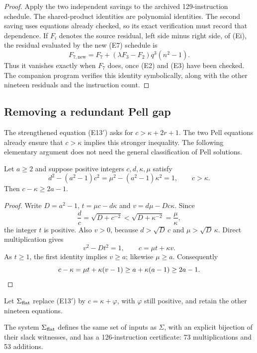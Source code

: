 \begin{proof}
Apply the two independent savings to the archived 129-instruction
schedule. The shared-product identities are polynomial identities. The
second saving uses equations already checked, so its exact verification
must record that dependence. If $F_i$ denotes the source residual, left
side minus right side, of (Ei), the residual evaluated by the new (E7)
schedule is
\[
 F_{7,\mathrm{new}}
   =F_7+(\lambda F_3-F_2)q^3(n^2-1).
\]
Thus it vanishes exactly when $F_7$ does, once (E2) and (E3) have been
checked. The companion program verifies this identity symbolically,
along with the other nineteen residuals and the instruction count.
\end{proof}

\subsection{Removing a redundant Pell gap}

The strengthened equation (E13$'$) asks for
$c>\kappa+2r+1$. The two Pell equations already ensure that $c>\kappa$
implies this stronger inequality. The following elementary argument does
not need the general classification of Pell solutions.

\begin{lemma}\label{lem:pellgap}
Let $a\ge2$ and suppose positive integers $c,d,\kappa,\mu$ satisfy
\[
 d^2-(a^2-1)c^2=\mu^2-(a^2-1)\kappa^2=1,
 \qquad c>\kappa.
\]
Then $c-\kappa\ge2a-1$.
\end{lemma}

\begin{proof}
Write $D=a^2-1$, $t=\mu c-d\kappa$ and
$v=d\mu-Dc\kappa$. Since
\[
 \frac dc=\sqrt{D+c^{-2}}<\sqrt{D+\kappa^{-2}}
 =\frac\mu\kappa,
\]
the integer $t$ is positive. Also $v>0$, because
$d>\sqrt D\,c$ and $\mu>\sqrt D\,\kappa$. Direct multiplication gives
\[
 v^2-Dt^2=1,\qquad c=\mu t+\kappa v.
\]
As $t\ge1$, the first identity implies $v\ge a$; likewise $\mu\ge a$.
Consequently
\[
 c-\kappa=\mu t+\kappa(v-1)
       \ge a+\kappa(a-1)\ge2a-1.\qedhere
\]
\end{proof}

Let $\Sigma_{\rm flat}$ replace (E13$'$) by $c=\kappa+\varphi$,
with $\varphi$ still positive, and retain the other nineteen equations.

\begin{theorem}\label{thm:126}
The system $\Sigma_{\rm flat}$ defines the same set of inputs as
$\Sigma$, with an explicit bijection of their slack witnesses, and has a
126-instruction certificate: 73 multiplications and 53 additions.
\end{theorem}

